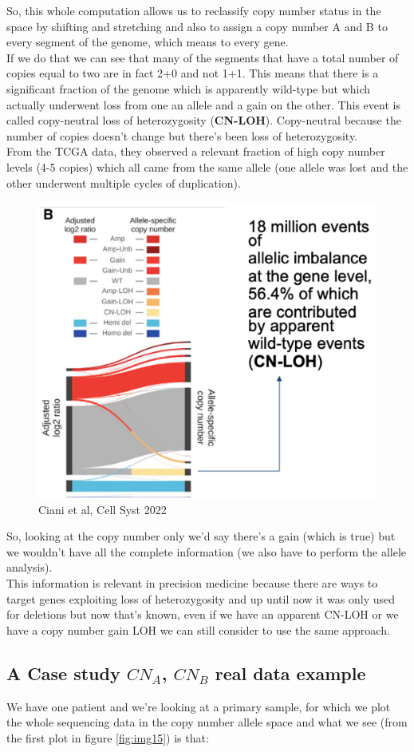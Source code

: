 So, this whole computation allows us to reclassify copy number status in the space by shifting and stretching and also to assign a copy number A and B to every segment of the genome, which means to every gene.
\\
If we do that we can see that many of the segments that have a total number of copies equal to two are in fact 2+0 and not 1+1. This means that there is a significant fraction of the genome which is apparently wild-type but which actually underwent loss from one an allele and a gain on the other. This event is called copy-neutral loss of heterozygosity (\textbf{CN-LOH}). Copy-neutral because the number of copies doesn't change but there's been loss of heterozygosity.
\\
From the TCGA data, they observed a relevant fraction of high copy number levels
(4-5 copies) which all came from the same allele (one allele was lost and the
other underwent multiple cycles of duplication).

\begin{figure}[H]
\centering
\includegraphics[width=0.5\linewidth]{image14.png}
\caption{Ciani et al, Cell Syst 2022}
\label{fig:img14}
\end{figure}

So, looking at the copy number only we'd say there's a gain (which is true) but we wouldn't have all the complete information (we also have to perform the allele analysis).
\\
This information is relevant in precision medicine because there are ways to target genes exploiting loss of heterozygosity and up until now it was only used for deletions but now that's known, even if we have an apparent CN-LOH or we have a copy number gain LOH we can still consider to use the same approach.

\subsection{A Case study $CN_A$, $CN_B$ real data example}
We have one patient and we're looking at a primary sample, for which we plot the
whole sequencing data in the copy number allele space and what we see (from the
first plot in figure \ref{fig:img15}) is that:

